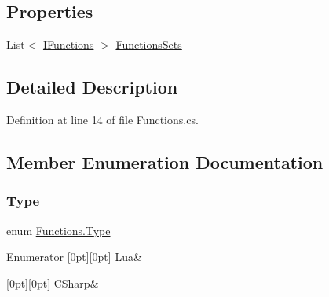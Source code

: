 \subsection*{Properties}
\begin{DoxyCompactItemize}
\item 
List$<$ \hyperlink{interface_i_functions}{I\+Functions} $>$ \hyperlink{class_functions_a254acb0bde27c6fc1bb10a1292309180}{Functions\+Sets}
\end{DoxyCompactItemize}


\subsection{Detailed Description}


Definition at line 14 of file Functions.\+cs.



\subsection{Member Enumeration Documentation}
\mbox{\label{class_functions_a652bc8a0dcb6afd360459f15e2d9bdf4}} 
\subsubsection{\texorpdfstring{Type}{Type}}
{\footnotesize\ttfamily enum \hyperlink{class_functions_a652bc8a0dcb6afd360459f15e2d9bdf4}{Functions.\+Type}\hspace{0.3cm}{\ttfamily [strong]}}

\begin{DoxyEnumFields}{Enumerator}
[0pt][0pt]{}\mbox{\label{class_functions_a652bc8a0dcb6afd360459f15e2d9bdf4a0ae9478a1db9d1e2c48efa49eac1c7c6}} 
Lua&\\
\hline

[0pt][0pt]{}\mbox{\label{class_functions_a652bc8a0dcb6afd360459f15e2d9bdf4a83925001a044cdfe0c64e9a44345b66d}} 
C\+Sharp&\\
\hline

\end{DoxyEnumFields}


